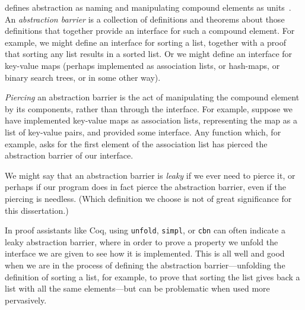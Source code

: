  defines abstraction as naming and manipulating compound elements as units~\cite[p.~6]{Structure1996Sussman}.
An \emph{abstraction barrier} is a collection of definitions and theorems about those definitions that together provide an interface for such a compound element.
For example, we might define an interface for sorting a list, together with a proof that sorting any list results in a sorted list.
Or we might define an interface for key-value maps (perhaps implemented as association lists, or hash-maps, or binary search trees, or in some other way).

\emph{Piercing} an abstraction barrier is the act of manipulating the compound element by its components, rather than through the interface.
For example, suppose we have implemented key-value maps as association lists, representing the map as a list of key-value pairs, and provided some interface.
Any function which, for example, asks for the first element of the association list has pierced the abstraction barrier of our interface.

We might say that an abstraction barrier is \emph{leaky} if we ever need to pierce it, or perhaps if our program does in fact pierce the abstraction barrier, even if the piercing is needless.
(Which definition we choose is not of great significance for this dissertation.)

In proof assistants like Coq, using \texttt{unfold}, \texttt{simpl}, or \texttt{cbn} can often indicate a leaky abstraction barrier, where in order to prove a property we unfold the interface we are given to see how it is implemented.
This is all well and good when we are in the process of defining the abstraction barrier---unfolding the definition of sorting a list, for example, to prove that sorting the list gives back a list with all the same elements---but can be problematic when used more pervasively.

